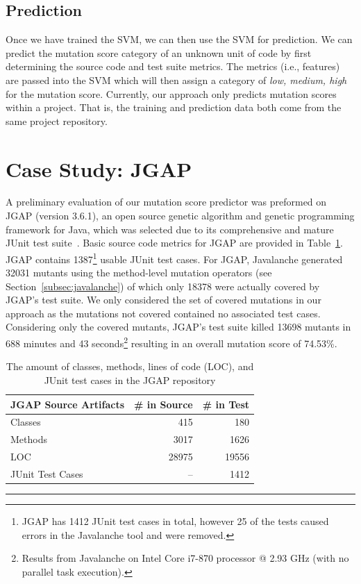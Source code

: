 \documentclass[conference]{IEEEtran}
\begin{document}
\subsection{Prediction}
\label{subsec:prediction}
Once we have trained the SVM, we can then use the SVM for prediction. We can predict the mutation score category of an unknown unit of code by first determining the source code and test suite metrics. The metrics (i.e., features) are passed into the SVM which will then assign a category of \textit{low, medium, high} for the mutation score.  Currently, our approach only predicts mutation scores within a project. That is, the training and prediction data both come from the same project repository.


\section{Case Study: JGAP}
\label{sec:case_study}
A preliminary evaluation of our mutation score predictor was preformed on JGAP (version 3.6.1), an open source genetic algorithm and genetic programming framework for Java, which was selected due to its comprehensive and mature JUnit test suite~\cite{JGAP}. Basic source code metrics for JGAP are provided in Table~\ref{tab:jgap_source_stats}. JGAP contains 1387\footnote{JGAP has 1412 JUnit test cases in total, however 25 of the tests caused errors in the Javalanche tool and were removed.} usable JUnit test cases. For JGAP, Javalanche generated 32031 mutants using the method-level mutation operators (see Section~\ref{subsec:javalanche}) of which only 18378 were actually covered by JGAP's test suite. We only considered the set of covered mutations in our approach as the mutations not covered contained no associated test cases. Considering only the covered mutants, JGAP's test suite killed 13698 mutants in 688 minutes and 43 seconds\footnote{Results from Javalanche on Intel Core i7-870 processor @ 2.93 GHz (with no parallel task execution).} resulting in an overall mutation score of 74.53\%.

\begin{table}[!t]
  \centering
  \begin{tabular}{|l|r|r|}
    \hline
    \rowcolor[RGB]{169,196,223}
    \textbf{JGAP Source Artifacts} & \textbf{\# in Source} & \textbf{\# in Test} \\
    \hline Classes & 415 & 180 \\
    \hline Methods & 3017 & 1626 \\
    \hline LOC & 28975 & 19556 \\
    \hline JUnit Test Cases & -- & 1412\footnotemark[1] \\
    \hline
  \end{tabular}
  \caption{The amount of classes, methods, lines of code (LOC), and JUnit test cases in the JGAP repository}
  \label{tab:jgap_source_stats}
  \vspace{2mm}
  \hrule
\end{table}
\end{document}
